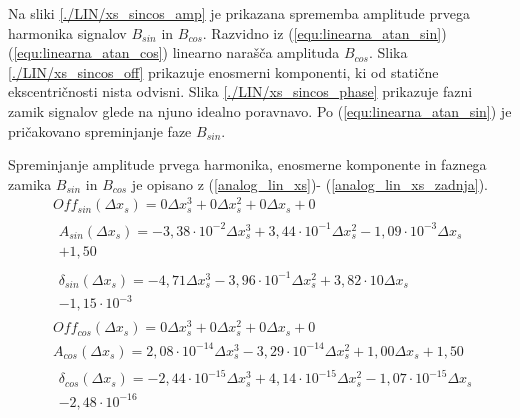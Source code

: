 Na sliki \ref{./LIN/xs_sincos_amp} je prikazana sprememba amplitude prvega harmonika signalov $B_{sin}$ in $B_{cos}$. Razvidno iz (\ref{equ:linearna_atan_sin})  (\ref{equ:linearna_atan_cos}) linearno narašča amplituda $B_{cos}$. Slika \ref{./LIN/xs_sincos_off} prikazuje enosmerni komponenti, ki od statične ekscentričnosti nista odvisni. Slika \ref{./LIN/xs_sincos_phase} prikazuje fazni zamik signalov glede na njuno idealno poravnavo. Po (\ref{equ:linearna_atan_sin}) je pričakovano spreminjanje faze $B_{sin}$.

Spreminjanje amplitude prvega harmonika, enosmerne komponente in faznega zamika $B_{sin}$ in $B_{cos}$ je opisano z (\ref{analog_lin_xs})- (\ref{analog_lin_xs_zadnja}). 
\begin{eqnarray}
\label{analog_lin_xs}
&Off_{sin}(\Delta x_s) = 0\Delta x_s^{3}+0\Delta x_s^{2}+0\Delta x_s+0 \\       
&\begin{split}A_{sin}(\Delta x_s) =-3,38\cdot 10^{-2}\Delta x_s^{3}+3,44\cdot 10^{-1}\Delta x_s^{2}-1,09\cdot 10^{-3}\Delta x_s\\+1,50 \end{split}\\                      
& \begin{split}\delta_{sin}(\Delta x_s) =-4,71\Delta x_s^{3}-3,96\cdot 10^{-1}\Delta x_s^{2}+3,82\cdot 10\Delta x_s\\-1,15\cdot 10^{-3}  \end{split}\\                             
&Off_{cos}(\Delta x_s) = 0\Delta x_s^{3}+0\Delta x_s^{2}+0\Delta x_s+0 \\       
&A_{cos}(\Delta x_s) =2,08\cdot 10^{-14}\Delta x_s^{3}-3,29\cdot 10^{-14}\Delta x_s^{2}+1,00\Delta x_s+1,50 \\ 
\label{analog_lin_xs_zadnja}                              
&\begin{split}\delta_{cos}(\Delta x_s) =-2,44\cdot 10^{-15}\Delta x_s^{3}+4,14\cdot 10^{-15}\Delta x_s^{2}-1,07\cdot 10^{-15}\Delta x_s\\-2,48\cdot 10^{-16} \end{split}
\end{eqnarray}
